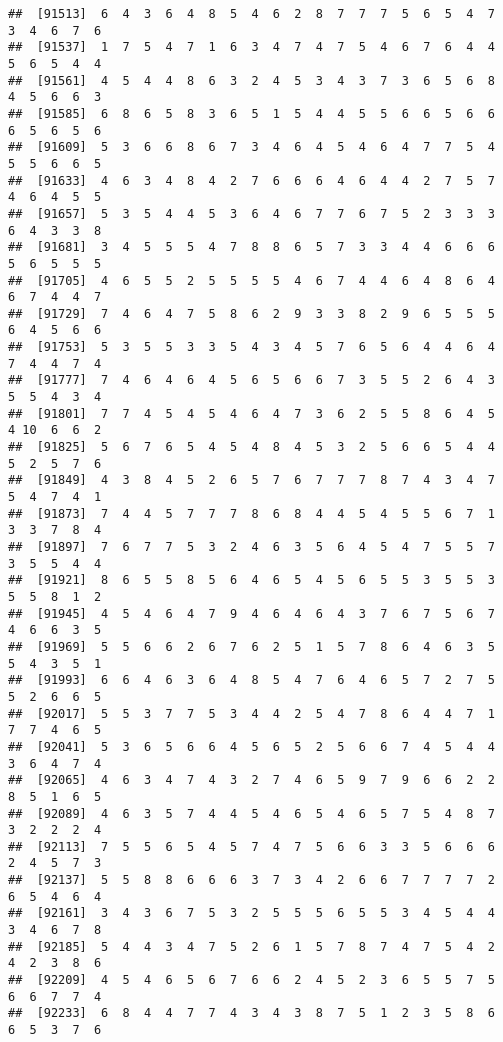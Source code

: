 \documentclass[
]{book}
\begin{document}
\begin{verbatim}
##  [91513]  6  4  3  6  4  8  5  4  6  2  8  7  7  7  5  6  5  4  7  3  4  6  7  6
##  [91537]  1  7  5  4  7  1  6  3  4  7  4  7  5  4  6  7  6  4  4  5  6  5  4  4
##  [91561]  4  5  4  4  8  6  3  2  4  5  3  4  3  7  3  6  5  6  8  4  5  6  6  3
##  [91585]  6  8  6  5  8  3  6  5  1  5  4  4  5  5  6  6  5  6  6  6  5  6  5  6
##  [91609]  5  3  6  6  8  6  7  3  4  6  4  5  4  6  4  7  7  5  4  5  5  6  6  5
##  [91633]  4  6  3  4  8  4  2  7  6  6  6  4  6  4  4  2  7  5  7  4  6  4  5  5
##  [91657]  5  3  5  4  4  5  3  6  4  6  7  7  6  7  5  2  3  3  3  6  4  3  3  8
##  [91681]  3  4  5  5  5  4  7  8  8  6  5  7  3  3  4  4  6  6  6  5  6  5  5  5
##  [91705]  4  6  5  5  2  5  5  5  5  4  6  7  4  4  6  4  8  6  4  6  7  4  4  7
##  [91729]  7  4  6  4  7  5  8  6  2  9  3  3  8  2  9  6  5  5  5  6  4  5  6  6
##  [91753]  5  3  5  5  3  3  5  4  3  4  5  7  6  5  6  4  4  6  4  7  4  4  7  4
##  [91777]  7  4  6  4  6  4  5  6  5  6  6  7  3  5  5  2  6  4  3  5  5  4  3  4
##  [91801]  7  7  4  5  4  5  4  6  4  7  3  6  2  5  5  8  6  4  5  4 10  6  6  2
##  [91825]  5  6  7  6  5  4  5  4  8  4  5  3  2  5  6  6  5  4  4  5  2  5  7  6
##  [91849]  4  3  8  4  5  2  6  5  7  6  7  7  7  8  7  4  3  4  7  5  4  7  4  1
##  [91873]  7  4  4  5  7  7  7  8  6  8  4  4  5  4  5  5  6  7  1  3  3  7  8  4
##  [91897]  7  6  7  7  5  3  2  4  6  3  5  6  4  5  4  7  5  5  7  3  5  5  4  4
##  [91921]  8  6  5  5  8  5  6  4  6  5  4  5  6  5  5  3  5  5  3  5  5  8  1  2
##  [91945]  4  5  4  6  4  7  9  4  6  4  6  4  3  7  6  7  5  6  7  4  6  6  3  5
##  [91969]  5  5  6  6  2  6  7  6  2  5  1  5  7  8  6  4  6  3  5  5  4  3  5  1
##  [91993]  6  6  4  6  3  6  4  8  5  4  7  6  4  6  5  7  2  7  5  5  2  6  6  5
##  [92017]  5  5  3  7  7  5  3  4  4  2  5  4  7  8  6  4  4  7  1  7  7  4  6  5
##  [92041]  5  3  6  5  6  6  4  5  6  5  2  5  6  6  7  4  5  4  4  3  6  4  7  4
##  [92065]  4  6  3  4  7  4  3  2  7  4  6  5  9  7  9  6  6  2  2  8  5  1  6  5
##  [92089]  4  6  3  5  7  4  4  5  4  6  5  4  6  5  7  5  4  8  7  3  2  2  2  4
##  [92113]  7  5  5  6  5  4  5  7  4  7  5  6  6  3  3  5  6  6  6  2  4  5  7  3
##  [92137]  5  5  8  8  6  6  6  3  7  3  4  2  6  6  7  7  7  7  2  6  5  4  6  4
##  [92161]  3  4  3  6  7  5  3  2  5  5  5  6  5  5  3  4  5  4  4  3  4  6  7  8
##  [92185]  5  4  4  3  4  7  5  2  6  1  5  7  8  7  4  7  5  4  2  4  2  3  8  6
##  [92209]  4  5  4  6  5  6  7  6  6  2  4  5  2  3  6  5  5  7  5  6  6  7  7  4
##  [92233]  6  8  4  4  7  7  4  3  4  3  8  7  5  1  2  3  5  8  6  6  5  3  7  6

\end{verbatim}
\end{document}
